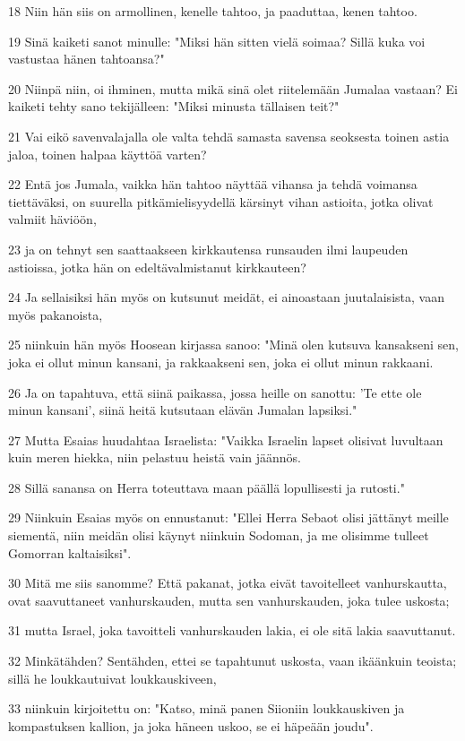 \par 18 Niin hän siis on armollinen, kenelle tahtoo, ja paaduttaa, kenen tahtoo.
\par 19 Sinä kaiketi sanot minulle: "Miksi hän sitten vielä soimaa? Sillä kuka voi vastustaa hänen tahtoansa?"
\par 20 Niinpä niin, oi ihminen, mutta mikä sinä olet riitelemään Jumalaa vastaan? Ei kaiketi tehty sano tekijälleen: "Miksi minusta tällaisen teit?"
\par 21 Vai eikö savenvalajalla ole valta tehdä samasta savensa seoksesta toinen astia jaloa, toinen halpaa käyttöä varten?
\par 22 Entä jos Jumala, vaikka hän tahtoo näyttää vihansa ja tehdä voimansa tiettäväksi, on suurella pitkämielisyydellä kärsinyt vihan astioita, jotka olivat valmiit häviöön,
\par 23 ja on tehnyt sen saattaakseen kirkkautensa runsauden ilmi laupeuden astioissa, jotka hän on edeltävalmistanut kirkkauteen?
\par 24 Ja sellaisiksi hän myös on kutsunut meidät, ei ainoastaan juutalaisista, vaan myös pakanoista,
\par 25 niinkuin hän myös Hoosean kirjassa sanoo: "Minä olen kutsuva kansakseni sen, joka ei ollut minun kansani, ja rakkaakseni sen, joka ei ollut minun rakkaani.
\par 26 Ja on tapahtuva, että siinä paikassa, jossa heille on sanottu: 'Te ette ole minun kansani', siinä heitä kutsutaan elävän Jumalan lapsiksi."
\par 27 Mutta Esaias huudahtaa Israelista: "Vaikka Israelin lapset olisivat luvultaan kuin meren hiekka, niin pelastuu heistä vain jäännös.
\par 28 Sillä sanansa on Herra toteuttava maan päällä lopullisesti ja rutosti."
\par 29 Niinkuin Esaias myös on ennustanut: "Ellei Herra Sebaot olisi jättänyt meille siementä, niin meidän olisi käynyt niinkuin Sodoman, ja me olisimme tulleet Gomorran kaltaisiksi".
\par 30 Mitä me siis sanomme? Että pakanat, jotka eivät tavoitelleet vanhurskautta, ovat saavuttaneet vanhurskauden, mutta sen vanhurskauden, joka tulee uskosta;
\par 31 mutta Israel, joka tavoitteli vanhurskauden lakia, ei ole sitä lakia saavuttanut.
\par 32 Minkätähden? Sentähden, ettei se tapahtunut uskosta, vaan ikäänkuin teoista; sillä he loukkautuivat loukkauskiveen,
\par 33 niinkuin kirjoitettu on: "Katso, minä panen Siioniin loukkauskiven ja kompastuksen kallion, ja joka häneen uskoo, se ei häpeään joudu".

